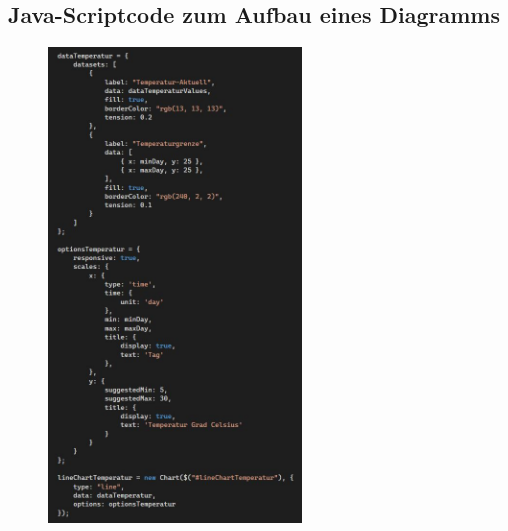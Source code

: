 \documentclass[conference]{IEEEtran}
\begin{document}
\begin{appendices}
\section{Java-Scriptcode zum Aufbau eines Diagramms}
\label{sec:jsdiagrammanhang}
\begin{figure}[h]
    \centering
    \includegraphics[width=0.60\textwidth]{fig/diagrammCode.JPG}
\end{figure}

\clearpage

\end{appendices}
\end{document}
